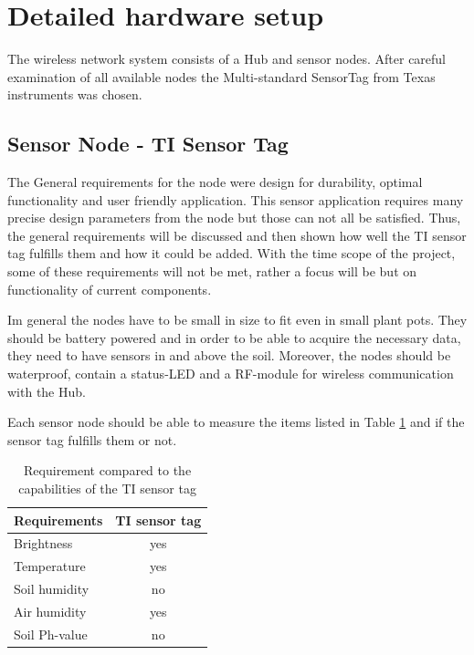 \section{Detailed hardware setup}

The wireless network system consists of a Hub and sensor nodes. After careful examination of all available nodes the Multi-standard SensorTag from Texas instruments \cite{TIsensortag} was chosen.


\subsection{Sensor Node - TI Sensor Tag}

The General requirements for the node were design for durability, optimal functionality and user friendly application. This sensor application requires many precise design parameters from the node but those can not all be satisfied. Thus, the general requirements will be discussed and then shown how well the TI sensor tag fulfills them and how it could be added. With the time scope of the project, some of these requirements will not be met, rather a focus will be but on functionality of current components.

Im general the nodes have to be small in size to fit even in small plant pots. They should be battery powered and in order to be able to acquire the necessary data, they need to have sensors in and above the soil. Moreover, the nodes should be waterproof, contain a status-LED and a RF-module for wireless communication with the Hub.

Each sensor node should be able to measure the items listed in Table \ref{list-req} and if the sensor tag fulfills them or not.
\begin{table}[htbp]
	\centering
	\begin{tabular}{lc}
		\toprule
		Requirements & \multicolumn{1}{l}{TI sensor tag} \\ 
		\midrule
		Brightness & yes \\ 
		Temperature & yes \\ 
		Soil humidity & no \\ 
		Air humidity & yes \\ 
		Soil Ph-value & no \\
		\bottomrule 
	\end{tabular}
	\vspace{0.1cm}
	\caption{Requirement compared to the capabilities of the TI sensor tag}
	\label{list-req}
\end{table}


